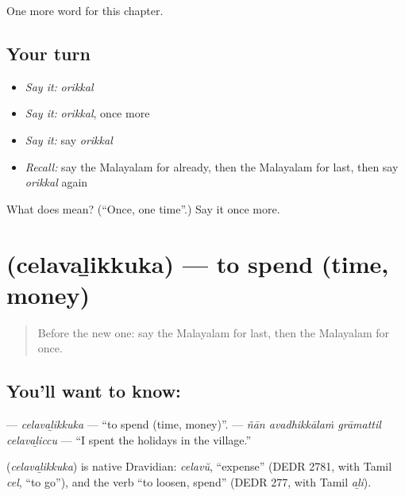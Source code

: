 \begin{grammarlens}[title={What you've built}]
One more word for this chapter.
\end{grammarlens}

\subsection*{Your turn}
\begin{itemize}
\raggedright
  \item \emph{Say it:} \emph{orikkal}
  \item \emph{Say it:} \emph{orikkal}, once more
  \item \emph{Say it:} say \emph{orikkal}
  \item \emph{Recall:} say the Malayalam for already, then the Malayalam for last, then say \emph{orikkal} again
\end{itemize}

\begin{tcolorbox}[breakable,colback=teal!4,colframe=teal!35!black,title={Before you move on}]
What does  mean? (\textquotedblleft{}Once, one time\textquotedblright{}.) Say it once more.
\end{tcolorbox}
\section[\texorpdfstring{\ml{ചെലവഴിക്കുക} (celavaḻikkuka)}{ചെലവഴിക്കുക (celavaḻikkuka)}]{ (celavaḻikkuka) — to spend (time, money)}

\label{lesson:ML-C178-celavazhikkuka}



\begin{quote}
Before the new one: say the Malayalam for last, then the Malayalam for once.
\end{quote}

\subsection*{You'll want to know: }
\textbf{} — \emph{celavaḻikkuka} — \textquotedblleft{}to spend (time, money)\textquotedblright{}. \textbf{   } — \emph{ñān avadhikkālaṁ grāmattil celavaḻiccu} — \textquotedblleft{}I spent the holidays in the village.\textquotedblright{}

\begin{cousinweb}
\textbf{} (\emph{celavaḻikkuka}) is native Dravidian: \emph{celavŭ}, \textquotedblleft{}expense\textquotedblright{} (DEDR 2781, with Tamil \emph{cel}, \textquotedblleft{}to go\textquotedblright{}), and the verb \textquotedblleft{}to loosen, spend\textquotedblright{} (DEDR 277, with Tamil \emph{aḻi}).
\end{cousinweb}

